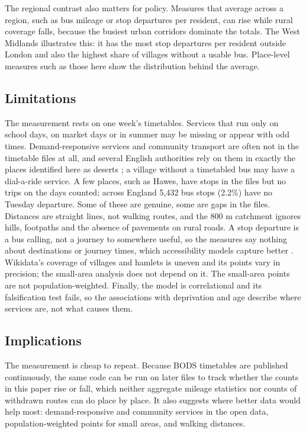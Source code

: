 \documentclass[11pt,a4paper]{article}
\begin{document}
The regional contrast also matters for policy. Measures that average across a region, such as bus mileage or stop departures per resident, can rise while rural coverage falls, because the busiest urban corridors dominate the totals. The West Midlands illustrates this: it has the most stop departures per resident outside London and also the highest share of villages without a usable bus. Place-level measures such as those here show the distribution behind the average.

\subsection{Limitations}
The measurement rests on one week's timetables. Services that run only on school days, on market days or in summer may be missing or appear with odd times. Demand-responsive services and community transport are often not in the timetable files at all, and several English authorities rely on them in exactly the places identified here as deserts \citep{mulley2009,gray2006}; a village without a timetabled bus may have a dial-a-ride service. A few places, such as Hawes, have stops in the files but no trips on the days counted; across England 5,432 bus stops (2.2\%) have no Tuesday departure. Some of these are genuine, some are gaps in the files. Distances are straight lines, not walking routes, and the 800 m catchment ignores hills, footpaths and the absence of pavements on rural roads. A stop departure is a bus calling, not a journey to somewhere useful, so the measures say nothing about destinations or journey times, which accessibility models capture better \citep{geurs2004}. Wikidata's coverage of villages and hamlets is uneven and its points vary in precision; the small-area analysis does not depend on it. The small-area points are not population-weighted. Finally, the model is correlational and its falsification test fails, so the associations with deprivation and age describe where services are, not what causes them.

\subsection{Implications}
The measurement is cheap to repeat. Because BODS timetables are published continuously, the same code can be run on later files to track whether the counts in this paper rise or fall, which neither aggregate mileage statistics nor counts of withdrawn routes can do place by place. It also suggests where better data would help most: demand-responsive and community services in the open data, population-weighted points for small areas, and walking distances.
\end{document}
